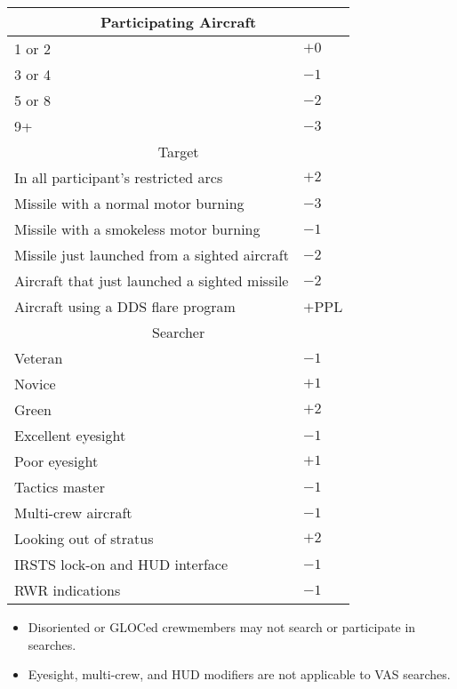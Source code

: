 {\begin{twocolumntablefloat}[t]
\begin{twocolumntable}
\begin{multicols}{2}
\begin{onecolumntable}
\begin{tabularx}{\linewidth}{Xl}
\toprule
\multicolumn{2}{c}{Participating Aircraft}\\
\midrule1 or 2&$+0$\\
3 or 4&$-1$\\
5 or 8&$-2$\\
9+    &$-3$\\
\midrule
\multicolumn{2}{c}{Target}\\
\midrule
In all participant's restricted arcs&$+2$\\
Missile with a normal motor burning&$-3$\\
Missile with a smokeless motor burning&$-1$\\
Missile just launched from a sighted aircraft&$-2$\\
Aircraft that just launched a sighted missile&$-2$\\
Aircraft using a DDS flare program&$+$PPL\\
\midrule
\multicolumn{2}{c}{Searcher}\\
\midrule
Veteran&$-1$\\
Novice&$+1$\\
Green&$+2$\\
Excellent eyesight&$-1$\\
Poor eyesight&$+1$\\
Tactics master&$-1$\\
Multi-crew aircraft&$-1$\\
Looking out of stratus&$+2$\\
IRSTS lock-on and HUD interface&$-1$\\
RWR indications&$-1$\\
\bottomrule
\end{tabularx}
\begin{tablenote}{1.0\linewidth}
\begin{itemize}
    \item Disoriented or GLOCed crewmembers may not search or participate in searches.
    \item Eyesight, multi-crew, and HUD modifiers are not applicable to VAS searches.
\end{itemize}
\end{tablenote}
\end{onecolumntable}

\end{multicols}
\end{twocolumntable}
\end{twocolumntablefloat}
}
